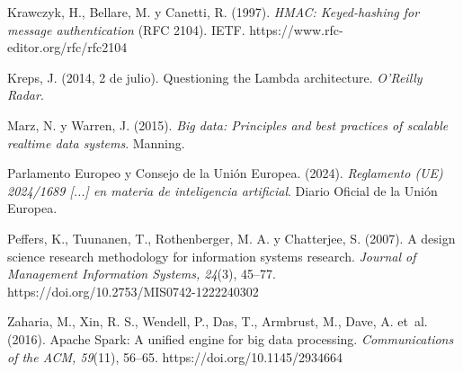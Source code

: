 \documentclass[10pt,twocolumn,letterpaper]{article}
\begin{document}
{Krawczyk, H., Bellare, M. y Canetti, R. (1997). \emph{HMAC: Keyed-hashing for message authentication} (RFC 2104). IETF. https://www.rfc-editor.org/rfc/rfc2104

Kreps, J. (2014, 2 de julio). Questioning the Lambda architecture. \emph{O'Reilly Radar}.

Marz, N. y Warren, J. (2015). \emph{Big data: Principles and best practices of scalable realtime data systems}. Manning.

Parlamento Europeo y Consejo de la Unión Europea. (2024). \emph{Reglamento (UE) 2024/1689 [...] en materia de inteligencia artificial}. Diario Oficial de la Unión Europea.

Peffers, K., Tuunanen, T., Rothenberger, M. A. y Chatterjee, S. (2007). A design science research methodology for information systems research. \emph{Journal of Management Information Systems, 24}(3), 45--77. https://doi.org/10.2753/MIS0742-1222240302

Zaharia, M., Xin, R. S., Wendell, P., Das, T., Armbrust, M., Dave, A. et~al. (2016). Apache Spark: A unified engine for big data processing. \emph{Communications of the ACM, 59}(11), 56--65. https://doi.org/10.1145/2934664

}
\end{document}
